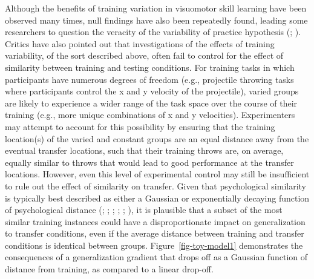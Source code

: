 \documentclass[
  11pt,
  letterpaper,
]{article}
\begin{document}
Although the benefits of training variation in visuomotor skill learning
have been observed many times, null findings have also been repeatedly
found, leading some researchers to question the veracity of the
variability of practice hypothesis
(;
).
Critics have also pointed out that investigations of the effects of
training variability, of the sort described above, often fail to control
for the effect of similarity between training and testing conditions.
For training tasks in which participants have numerous degrees of
freedom (e.g., projectile throwing tasks where participants control the
x and y velocity of the projectile), varied groups are likely to
experience a wider range of the task space over the course of their
training (e.g., more unique combinations of x and y velocities).
Experimenters may attempt to account for this possibility by ensuring
that the training location(s) of the varied and constant groups are an
equal distance away from the eventual transfer locations, such that
their training throws are, on average, equally similar to throws that
would lead to good performance at the transfer locations. However, even
this level of experimental control may still be insufficient to rule out
the effect of similarity on transfer. Given that psychological
similarity is typically best described as either a Gaussian or
exponentially decaying function of psychological distance
(;
; ; ; ; ), it is plausible that a subset of the most similar
training instances could have a disproportionate impact on
generalization to transfer conditions, even if the average distance
between training and transfer conditions is identical between groups.
Figure~\ref{fig-toy-model1} demonstrates the consequences of a
generalization gradient that drops off as a Gaussian function of
distance from training, as compared to a linear drop-off.
\end{document}
